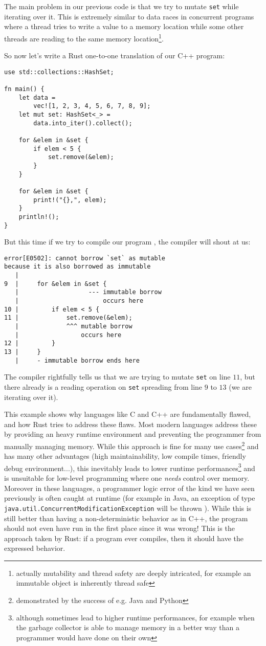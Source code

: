 \documentclass[twocolumn]{article}
\newcommand{\rust}[1]{\texttt{#1}}
\newcommand{\cpp}[1]{\texttt{#1}}
\begin{document}
The main problem in our previous code is that we try to mutate \cpp{set} while iterating over it. This is extremely similar to data races in concurrent programs where a thread tries to write a value to a memory location while some other threads are reading to the same memory location\footnote{actually mutability and thread safety are deeply intricated, for example an immutable object is inherently thread safe}.

So now let's write a Rust one-to-one translation of our C++ program:
\begin{verbatim}
use std::collections::HashSet;

fn main() {
    let data =
        vec![1, 2, 3, 4, 5, 6, 7, 8, 9];
    let mut set: HashSet<_> =
        data.into_iter().collect();
    
    for &elem in &set {
        if elem < 5 {
            set.remove(&elem);
        }
    }
    
    for &elem in &set {
        print!("{},", elem);
    }
    println!();
}
\end{verbatim}
But this time if we try to compile our program \cite{example2}, the compiler will shout at us:
\begin{verbatim}
error[E0502]: cannot borrow `set` as mutable
because it is also borrowed as immutable
   |
9  |     for &elem in &set {
   |                   --- immutable borrow
   |                       occurs here
10 |         if elem < 5 {
11 |             set.remove(&elem);
   |             ^^^ mutable borrow
   |                 occurs here
12 |         }
13 |     }
   |     - immutable borrow ends here
\end{verbatim}
The compiler rightfully tells us that we are trying to mutate \rust{set} on line $11$, but there already is a reading operation on \rust{set} spreading from line $9$ to $13$ (we are iterating over it).

This example shows why languages like C and C++ are fundamentally flawed, and how Rust tries to address these flaws. Most modern languages address these by providing an heavy runtime environment and preventing the programmer from manually managing memory. While this approach is fine for many use cases\footnote{demonstrated by the success of e.g. Java and Python} and has many other advantages (high maintainability, low compile times, friendly debug environment...), this inevitably leads to lower runtime performances\footnote{although sometimes lead to higher runtime performances, for example when the garbage collector is able to manage memory in a better way than a programmer would have done on their own} and is unsuitable for low-level programming where one \textit{needs} control over memory. Moreover in these languages, a programmer logic error of the kind we have seen previously is often caught at runtime (for example in Java, an exception of type \texttt{java.util.ConcurrentModificationException} will be thrown \cite{java-doc}). While this is still better than having a non-deterministic behavior as in C++, the program should not even have run in the first place since it was wrong! This is the approach taken by Rust: if a program ever compiles, then it should have the expressed behavior.
\end{document}
